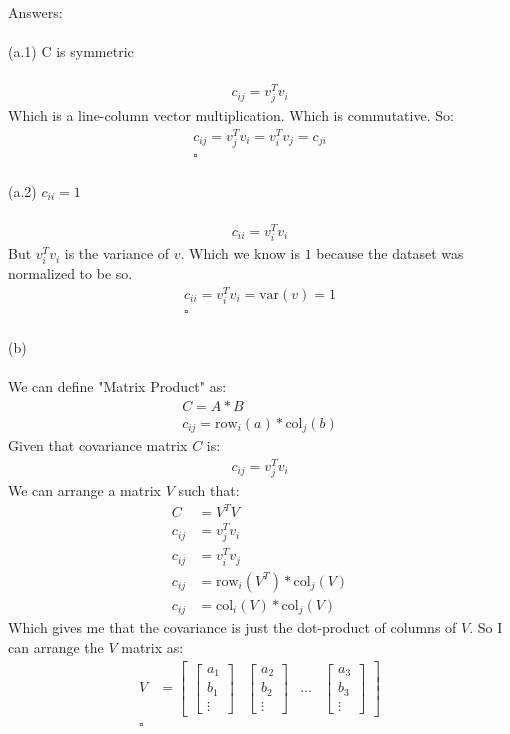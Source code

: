 \documentclass{article}
\begin{document}
	\\
	Answers:\\
	\\
	(a.1) C is symmetric\\
	\\
	\begin{align*}
		c_{ij} = v_j^Tv_i
	\end{align*}
	Which is a line-column vector multiplication. Which is commutative. So:\\
	\begin{align*}
	c_{ij} = v_j^Tv_i = v_i^Tv_j = c_{ji}\\
	\square
	\end{align*}
	\\
	(a.2) $c_{ii} = 1$\\
	\\
	\begin{align*}
		c_{ii} = v_i^Tv_i
	\end{align*}
	But $v_i^Tv_i$ is the variance of $v$. Which we know is $1$ because the dataset was normalized to be so.
	\begin{align*}
		c_{ii} = v_i^Tv_i = \text{var}(v) = 1\\
		\square
	\end{align*}
	\\
	(b)\\
	\\
	We can define "Matrix Product" as:\\
	\begin{align*}
		C = A*B\\
		c_{ij} = \text{row}_i(a)*\text{col}_j(b)
	\end{align*}
	Given that covariance matrix $C$ is:
	\begin{align*}
		c_{ij} = v_j^Tv_i
	\end{align*}
	We can arrange a matrix $V$ such that:
	\begin{align*}
		C &= V^TV\\
		c_{ij} &= v_j^Tv_i\\
		c_{ij} &= v_i^Tv_j\\
		c_{ij} &= \text{row}_i(V^T)*\text{col}_j(V)\\
		c_{ij} &= \text{col}_i(V)*\text{col}_j(V)
	\end{align*}
	Which gives me that the covariance is just the dot-product of columns of $V$. So I can arrange the $V$ matrix as:
	\begin{align*}
	V &= 
	\begin{bmatrix}
		\begin{bmatrix}a_1\\b_1\\\vdots\end{bmatrix}&
		\begin{bmatrix}a_2\\b_2\\\vdots\end{bmatrix}&
		...&
		\begin{bmatrix}a_3\\b_3\\\vdots\end{bmatrix}
	\end{bmatrix}\\
	\square
	\end{align*}
\end{document}
